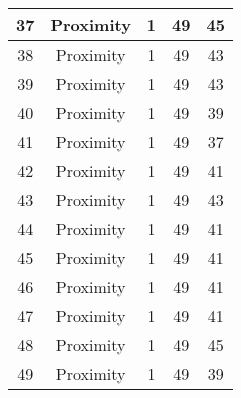 \documentclass[results.tex]{subfiles}
\begin{document}
\begin{center}
\begin{tabular}{| c || c | c | c | c |}
            \hline
            37                      & Proximity                    & 1                      & 49                      & 45                   \\
            \hline
            38                      & Proximity                    & 1                      & 49                      & 43                   \\
            \hline
            39                      & Proximity                    & 1                      & 49                      & 43                   \\
            \hline
            40                      & Proximity                    & 1                      & 49                      & 39                   \\
            \hline
            41                      & Proximity                    & 1                      & 49                      & 37                   \\
            \hline
            42                      & Proximity                    & 1                      & 49                      & 41                   \\
            \hline
            43                      & Proximity                    & 1                      & 49                      & 43                   \\
            \hline
            44                      & Proximity                    & 1                      & 49                      & 41                   \\
            \hline
            45                      & Proximity                    & 1                      & 49                      & 41                   \\
            \hline
            46                      & Proximity                    & 1                      & 49                      & 41                   \\
            \hline
            47                      & Proximity                    & 1                      & 49                      & 41                   \\
            \hline
            48                      & Proximity                    & 1                      & 49                      & 45                   \\
            \hline
            49                      & Proximity                    & 1                      & 49                      & 39                   \\
            \hline
        \end{tabular}
    \end{center}
\end{document}
